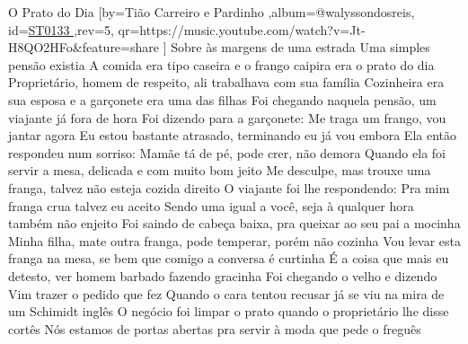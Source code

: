 \beginsong
{O Prato do Dia %
}[by={Tião Carreiro e Pardinho %
},album={@walyssondosreis},
id={\href{https://music.youtube.com/watch?v=Jt-H8QO2HFo&feature=share %
}{ST0133 %
}},rev={5}, %
qr={https://music.youtube.com/watch?v=Jt-H8QO2HFo&feature=share %
}]
\beginverse
Sobre às margens de uma estrada
Uma simples pensão existia
A comida era tipo caseira e o frango caipira era o prato do dia 
Proprietário, homem de respeito, ali trabalhava com sua família
Cozinheira era sua esposa e a garçonete era uma das filhas
\endverse
{}
\beginverse
Foi chegando naquela pensão, um viajante já fora de hora
Foi dizendo para a garçonete: Me traga um frango, vou jantar agora
Eu estou bastante atrasado, terminando eu já vou embora
Ela então respondeu num sorriso: Mamãe tá de pé, pode crer, não demora
\endverse
{}
\beginverse
Quando ela foi servir a mesa, delicada e com muito bom jeito
Me desculpe, mas trouxe uma franga, talvez não esteja cozida direito
O viajante foi lhe respondendo: Pra mim franga crua talvez eu aceito
Sendo uma igual a você, seja à qualquer hora também não enjeito
\endverse
{}
\beginverse
Foi saindo de cabeça baixa, pra queixar ao seu pai a mocinha
Minha filha, mate outra franga, pode temperar, porém não cozinha
Vou levar esta franga na mesa, se bem que comigo a conversa é curtinha
É a coisa que mais eu detesto, ver homem barbado fazendo gracinha
\endverse
{}
\beginverse
Foi chegando o velho e dizendo
Vim trazer o pedido que fez
Quando o cara tentou recusar já se viu na mira de um Schimidt inglês
O negócio foi limpar o prato quando o proprietário lhe disse cortês
Nós estamos de portas abertas pra servir à moda que pede o freguês
\endverse
{}
\vspace{4em} %
